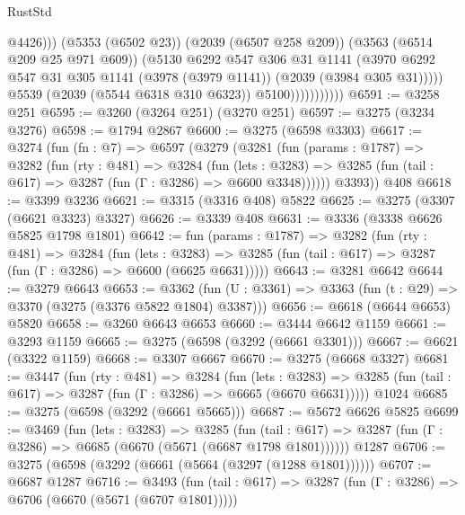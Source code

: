 \begin{lexlean}{RustStd}
\begin{coremodule}
                                  @4426)))
                            (@5353 (@6502 @23))
                            (@2039 (@6507 @258 @209))
                            (@3563 (@6514 @209 @25 @971 @609))
                            (@5130
                              @6292
                              @547
                              @306
                              @31
                              @1141
                              (@3970
                                @6292
                                @547
                                @31
                                @305
                                @1141
                                (@3978 (@3979 @1141))
                                (@2039 (@3984 @305 @31)))))
                          @5539
                          (@2039 (@5544 @6318 @310 @6323))
                          @5100)))))))))))
@6591 := @3258 @251
@6595 := @3260 (@3264 @251) (@3270 @251)
@6597 := @3275 (@3234 @3276)
@6598 := @1794 @2867
@6600 := @3275 (@6598 @3303)
@6617 := @3274
    (fun (fn : @7) =>
    @6597
      (@3279
        (@3281
          (fun (params : @1787) =>
          @3282
            (fun (rty : @481) =>
            @3284
              (fun (lets : @3283) =>
              @3285 (fun (tail : @617) => @3287 (fun (Γ : @3286) => @6600 @3348))))))
        @3393))
    @408
@6618 := @3399 @3236
@6621 := @3315 (@3316 @408) @5822
@6625 := @3275 (@3307 (@6621 @3323) @3327)
@6626 := @3339 @408
@6631 := @3336 (@3338 @6626 @5825 @1798 @1801)
@6642 := fun (params : @1787) =>
  @3282
    (fun (rty : @481) =>
    @3284
      (fun (lets : @3283) =>
      @3285 (fun (tail : @617) => @3287 (fun (Γ : @3286) => @6600 (@6625 @6631)))))
@6643 := @3281 @6642
@6644 := @3279 @6643
@6653 := @3362 (fun (U : @3361) => @3363 (fun (t : @29) => @3370 (@3275 (@3376 @5822 @1804) @3387)))
@6656 := @6618 (@6644 @6653) @5820
@6658 := @3260 @6643 @6653
@6660 := @3444 @6642 @1159
@6661 := @3293 @1159
@6665 := @3275 (@6598 (@3292 (@6661 @3301)))
@6667 := @6621 (@3322 @1159)
@6668 := @3307 @6667
@6670 := @3275 (@6668 @3327)
@6681 := @3447
    (fun (rty : @481) =>
    @3284
      (fun (lets : @3283) =>
      @3285 (fun (tail : @617) => @3287 (fun (Γ : @3286) => @6665 (@6670 @6631)))))
    @1024
@6685 := @3275 (@6598 (@3292 (@6661 @5665)))
@6687 := @5672 @6626 @5825
@6699 := @3469
    (fun (lets : @3283) =>
    @3285
      (fun (tail : @617) => @3287 (fun (Γ : @3286) => @6685 (@6670 (@5671 (@6687 @1798 @1801))))))
    @1287
@6706 := @3275 (@6598 (@3292 (@6661 (@5664 (@3297 (@1288 @1801))))))
@6707 := @6687 @1287
@6716 := @3493
    (fun (tail : @617) => @3287 (fun (Γ : @3286) => @6706 (@6670 (@5671 (@6707 @1801)))))

\end{coremodule}
\end{lexlean}
